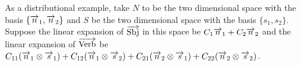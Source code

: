 As a distributional example, take $N$ to be the two dimensional space with the basis $\{\overrightarrow{n}_1, \overrightarrow{n}_2\}$ and $S$ be the two dimensional space with the basis $\{s_1, s_2\}$. Suppose the linear expansion of $\overrightarrow{\text{Sbj}}$ in this space be $C_1 \overrightarrow{n}_1 + C_2 \overrightarrow{n}_2$ and the linear expansion of $\overrightarrow{\text{Verb}}$ be $C_{11} (\overrightarrow{n}_1 \otimes \overrightarrow{s}_1) + C_{12} (\overrightarrow{n}_1 \otimes \overrightarrow{s}_2) +  C_{21} ( \overrightarrow{n}_2 \otimes \overrightarrow{s}_1) + C_{22} (\overrightarrow{n}_2 \otimes \overrightarrow{s}_2)$.  
